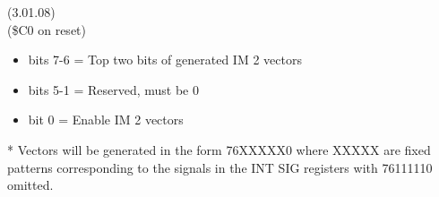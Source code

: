  (3.01.08)\\
(\$C0 on reset)
\begin{itemize}
\item bits 7-6 = Top two bits of generated IM 2 vectors
\item bits 5-1 = Reserved, must be 0
\item bit 0 = Enable IM 2 vectors
\end{itemize}
* Vectors will be generated in the form 76XXXXX0 where XXXXX are fixed
  patterns corresponding to the signals in the INT SIG registers with
  76111110 omitted.



